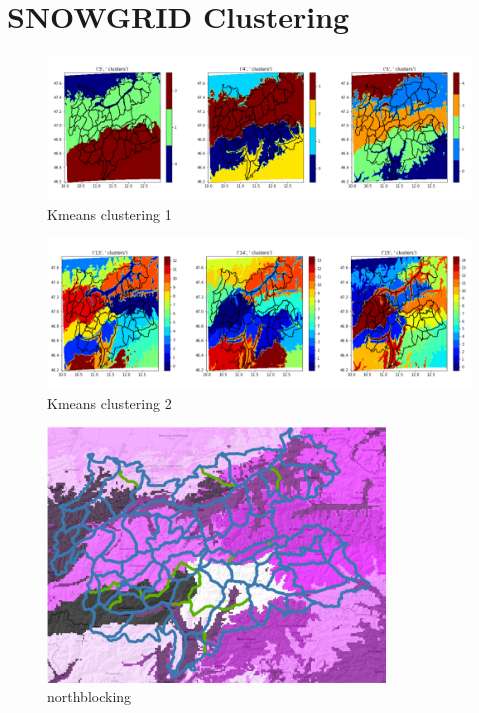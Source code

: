 \chapter{SNOWGRID Clustering}


\begin{figure}[ht]
    \centering
    \includegraphics[width=\textwidth]{Figures/figures_snowgrid/cluster_sen_1.png}
    \caption{Kmeans clustering 1}
\end{figure}

\begin{figure}[ht]
    \centering
    \includegraphics[width=\textwidth]{Figures/figures_snowgrid/clustersens_2.png}
    \caption{Kmeans clustering 2}
\end{figure}

\begin{figure}[ht]
    \centering
    \includegraphics[width=0.8\textwidth]{Figures/figures_snowgrid/northblocking_15cluster.png}
    \caption{northblocking}
\end{figure}

